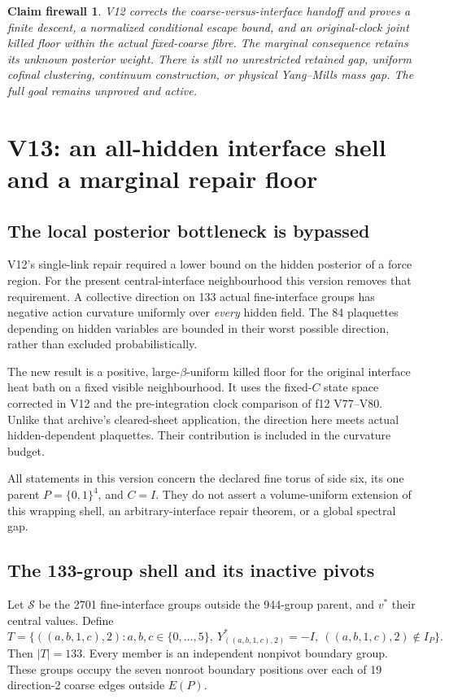 \documentclass[11pt,oneside]{article}
\newtheorem{firewall}[theorem]{Claim firewall}
\begin{document}
\begin{firewall}
V12 corrects the coarse-versus-interface
handoff and proves a finite descent, a
normalized conditional escape bound, and
an original-clock joint killed floor within
the actual fixed-coarse fibre. The marginal
consequence retains its unknown posterior
weight. There is still no unrestricted
retained gap, uniform cofinal clustering,
continuum construction, or physical
Yang--Mills mass gap. The full goal remains
unproved and active.
\end{firewall}
\section{V13: an all-hidden interface shell and a marginal repair floor}
\label{sec:f13v13}

\subsection{The local posterior bottleneck is bypassed}

V12's single-link repair required a lower bound on
the hidden posterior of a force region. For the
present central-interface neighbourhood this version
removes that requirement. A collective direction on
133 actual fine-interface groups has negative action
curvature uniformly over \emph{every} hidden field.
The 84 plaquettes depending on hidden variables are
bounded in their worst possible direction, rather
than excluded probabilistically.

The new result is a positive, large-\(\beta\)-uniform
killed floor for the original interface heat bath
on a fixed visible neighbourhood. It uses the
fixed-\(C\) state space corrected in V12 and the
pre-integration clock comparison of f12 V77--V80.
Unlike that archive's cleared-sheet application,
the direction here meets actual hidden-dependent
plaquettes. Their contribution is included in the
curvature budget.

All statements in this version concern the declared
fine torus of side six, its one parent
\(P=\{0,1\}^4\), and \(C=I\). They do not assert
a volume-uniform extension of this wrapping shell,
an arbitrary-interface repair theorem, or a global
spectral gap.

\subsection{The 133-group shell and its inactive pivots}

Let \(\mathcal S\) be the 2701 fine-interface groups
outside the 944-group parent, and \(v^*\) their
central values. Define
\begin{equation}\label{eq:f13v13-shell}
 T=\{((a,b,1,c),2):a,b,c\in\{0,\ldots,5\},\
       Y^*_{((a,b,1,c),2)}=-I,\
                 ((a,b,1,c),2)\notin I_P\}.
\end{equation}
Then \(|T|=133\). Every member is an independent
nonpivot boundary group. These groups occupy
the seven nonroot boundary positions over each
of 19 direction-2 coarse edges outside \(E(P)\).
\end{document}
